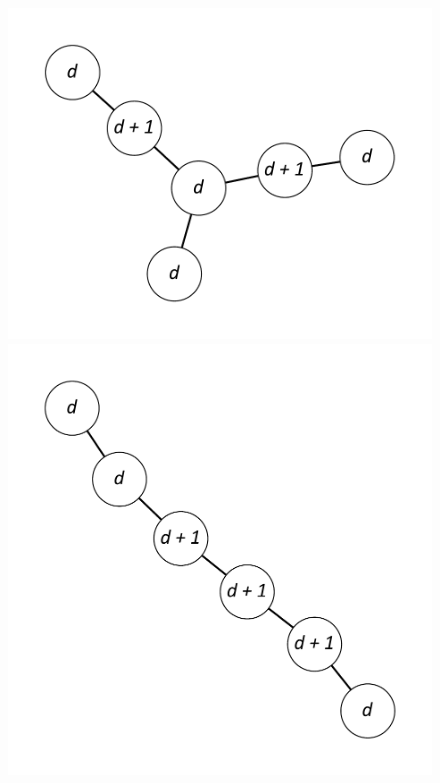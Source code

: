 \documentclass[12pt]{article}
\theoremstyle{plain}
\theoremstyle{definition}
\theoremstyle{remark}
\begin{document}
\begin{figure}[!htb]
\includegraphics[scale=0.25]{Superabundance/MaxDegree3Trees/001010011001000[3,3,1,1,1,3].pdf}
\includegraphics[scale=0.25]{Superabundance/MaxDegree3Trees/001010011010000[2,3,1,1,3,3].pdf}

\end{figure}
\end{document}
